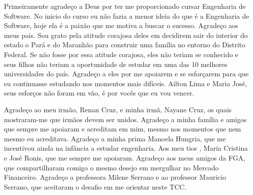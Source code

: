 \begin{agradecimentos}

Primeiramente agradeço a Deus por ter me proporcionado cursar Engenharia de Software. No inicio do curso eu não fazia a menor ideia do que é a Engenharia de Software, hoje ela é a paixão que me motiva a buscar o sucesso. Agradeço aos meus pais. Sou grato pela atitude corajosa deles em decidirem sair do interior do estado o Pará e do Maranhão para construir uma família no entorno do Distrito Federal. Se não fosse por essa atitude corajosa, eles não teriam se conhecido e seus filhos não teriam a oportunidade de estudar em uma das 10 melhores universidades do país. Agradeço a eles por me apoiarem e se esforçarem para que eu continuasse estudando nos momentos mais difíceis. Ailton Lima e Maria José, seus esforços não foram em vão, é por vocês que eu vou vencer.

Agradeço ao meu irmão, Renan Cruz, e minha irmã, Nayane Cruz, os quais mostraram-me que irmãos devem ser unidos. Agradeço a minha família e amigos que sempre me apoiaram e acreditam em mim, mesmo nos momentos que nem mesmo eu acreditava. Agradeço a minha prima Manoela Hungria, que me incentivou ainda na infância a estudar engenharia. Aos meu tios , Maria Cristina e José Ronis, que me sempre me apoiaram. Agradeço aos meus amigos da FGA, que compartilharam comigo o mesmo desejo em mergulhar no Mercado Financeiro. Agradeço a professora Milene Serrano e ao professor Mauricio Serrano, que aceitaram o desafio em me orientar neste TCC.

\end{agradecimentos}
